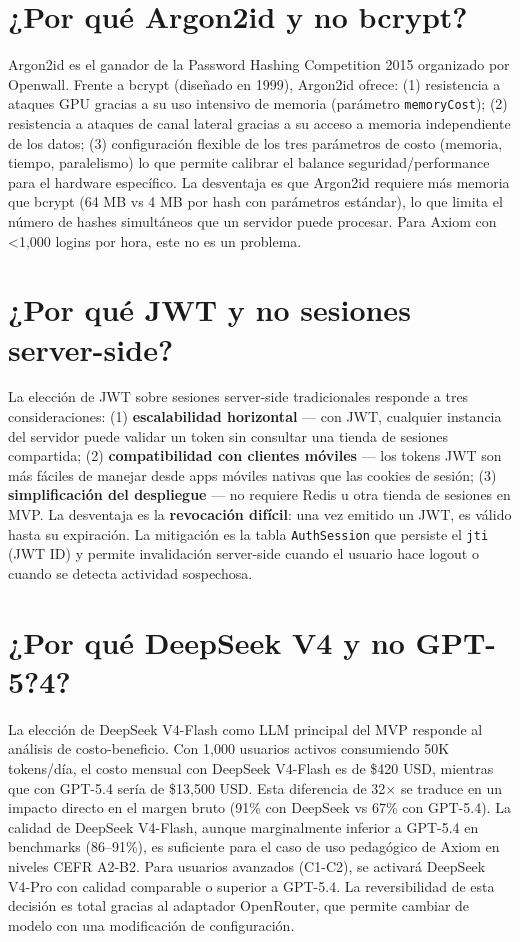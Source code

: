 \section{¿Por qué Argon2id y no bcrypt?}
Argon2id es el ganador de la Password Hashing Competition 2015 organizado por Openwall. Frente a bcrypt (diseñado en 1999), Argon2id ofrece: (1) resistencia a ataques GPU gracias a su uso intensivo de memoria (parámetro \texttt{memoryCost}); (2) resistencia a ataques de canal lateral gracias a su acceso a memoria independiente de los datos; (3) configuración flexible de los tres parámetros de costo (memoria, tiempo, paralelismo) lo que permite calibrar el balance seguridad/performance para el hardware específico. La desventaja es que Argon2id requiere más memoria que bcrypt (64 MB vs 4 MB por hash con parámetros estándar), lo que limita el número de hashes simultáneos que un servidor puede procesar. Para Axiom con <1,000 logins por hora, este no es un problema.

\section{¿Por qué JWT y no sesiones server-side?}
La elección de JWT sobre sesiones server-side tradicionales responde a tres consideraciones: (1) \textbf{escalabilidad horizontal} — con JWT, cualquier instancia del servidor puede validar un token sin consultar una tienda de sesiones compartida; (2) \textbf{compatibilidad con clientes móviles} — los tokens JWT son más fáciles de manejar desde apps móviles nativas que las cookies de sesión; (3) \textbf{simplificación del despliegue} — no requiere Redis u otra tienda de sesiones en MVP. La desventaja es la \textbf{revocación difícil}: una vez emitido un JWT, es válido hasta su expiración. La mitigación es la tabla \texttt{AuthSession} que persiste el \texttt{jti} (JWT ID) y permite invalidación server-side cuando el usuario hace logout o cuando se detecta actividad sospechosa.

\section{¿Por qué DeepSeek V4 y no GPT-5?4?}
La elección de DeepSeek V4-Flash como LLM principal del MVP responde al análisis de costo-beneficio. Con 1,000 usuarios activos consumiendo 50K tokens/día, el costo mensual con DeepSeek V4-Flash es de \$420 USD, mientras que con GPT-5.4 sería de \$13,500 USD. Esta diferencia de 32× se traduce en un impacto directo en el margen bruto (91\% con DeepSeek vs 67\% con GPT-5.4). La calidad de DeepSeek V4-Flash, aunque marginalmente inferior a GPT-5.4 en benchmarks (86--91\%), es suficiente para el caso de uso pedagógico de Axiom en niveles CEFR A2-B2. Para usuarios avanzados (C1-C2), se activará DeepSeek V4-Pro con calidad comparable o superior a GPT-5.4. La reversibilidad de esta decisión es total gracias al adaptador OpenRouter, que permite cambiar de modelo con una modificación de configuración.

